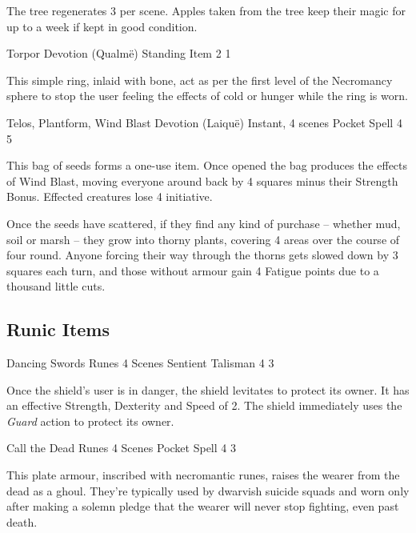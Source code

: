 \begin{multicols}{2}
The tree regenerates 3 per scene.  Apples taken from the tree keep their magic for up to a week if kept in good condition.

	{Torpor}%
	{Devotion (Qualm\"{e})}%
	{Standing}%
	{Item}%
	{2}%
	{1}\label{ring_asphyxiation}%

This simple ring, inlaid with bone, act as per the first level of the Necromancy sphere to stop the user feeling the effects of cold or hunger while the ring is worn.

	{Telos, Plantform, Wind Blast}%
	{Devotion (Laiqu\"{e})}%
	{Instant, 4 scenes}%
	{Pocket Spell}%
	{4}%
	{5}%

This bag of seeds forms a one-use item.
Once opened the bag produces the effects of Wind Blast, moving everyone around back by 4 squares minus their Strength Bonus.
Effected creatures lose 4 initiative.

Once the seeds have scattered, if they find any kind of purchase -- whether mud, soil or marsh -- they grow into thorny plants, covering 4 areas over the course of four round.
Anyone forcing their way through the thorns gets slowed down by 3 squares each turn, and those without armour gain 4 Fatigue points due to a thousand little cuts.

\subsection{Runic Items}

	{Dancing Swords}%
	{Runes}%
	{4 Scenes}%
	{Sentient Talisman}%
	{4}%
	{3}%

Once the shield's user is in danger, the shield levitates to protect its owner.
It has an effective Strength, Dexterity and Speed of 2.
The shield immediately uses the \textit{Guard} action to protect its owner.

	{Call the Dead}%
	{Runes}%
	{4 Scenes}%
	{Pocket Spell}%
	{4}%
	{3}%

\label{eternalwarriorarmour}

This plate armour, inscribed with necromantic runes, raises the wearer from the dead as a ghoul.
They're typically used by dwarvish suicide squads and worn only after making a solemn pledge that the wearer will never stop fighting, even past death.


\end{multicols}
